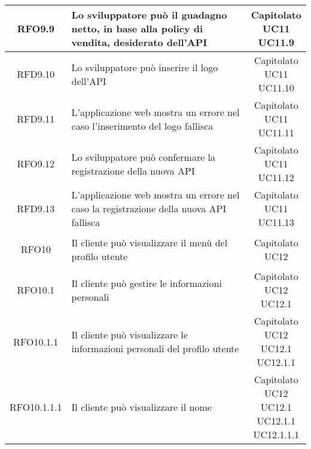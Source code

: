\begin{longtable}{|c|p{8cm}|c|}
\hypertarget{RFO9.9}{RFO9.9} & Lo sviluppatore può il guadagno netto, in base alla policy di vendita, desiderato dell'API & \makecell*{Capitolato\\UC11\\UC11.9} \\
\hline
\hypertarget{RFD9.10}{RFD9.10} & Lo sviluppatore può inserire il logo dell'API & \makecell*{Capitolato\\UC11\\UC11.10} \\
\hline
\hypertarget{RFD9.11}{RFD9.11} & L'applicazione web mostra un errore nel caso l'inserimento del logo fallisca & \makecell*{Capitolato\\UC11\\UC11.11} \\
\hline
\hypertarget{RFO9.12}{RFO9.12} & Lo sviluppatore può confermare la registrazione della nuova API & \makecell*{Capitolato\\UC11\\UC11.12} \\
\hline
\hypertarget{RFD9.13}{RFD9.13} & L'applicazione web mostra un errore nel caso la registrazione della nuova API fallisca & \makecell*{Capitolato\\UC11\\UC11.13} \\
\hline

\hypertarget{RFO10}{RFO10} & Il cliente può visualizzare il menù del profilo utente & \makecell*{Capitolato\\UC12} \\
\hline

\hypertarget{RFO10.1}{RFO10.1} & Il cliente può gestire le informazioni personali & \makecell*{Capitolato\\UC12\\UC12.1} \\
\hline

\hypertarget{RFO10.1.1}{RFO10.1.1} & Il cliente può visualizzare le informazioni personali del profilo utente &\makecell*{Capitolato\\UC12\\UC12.1\\UC12.1.1} \\
\hline

\hypertarget{RFO10.1.1.1}{RFO10.1.1.1} & Il cliente può visualizzare il nome & \makecell*{Capitolato\\UC12\\UC12.1\\UC12.1.1\\UC12.1.1.1} \\
\hline


\end{longtable}

